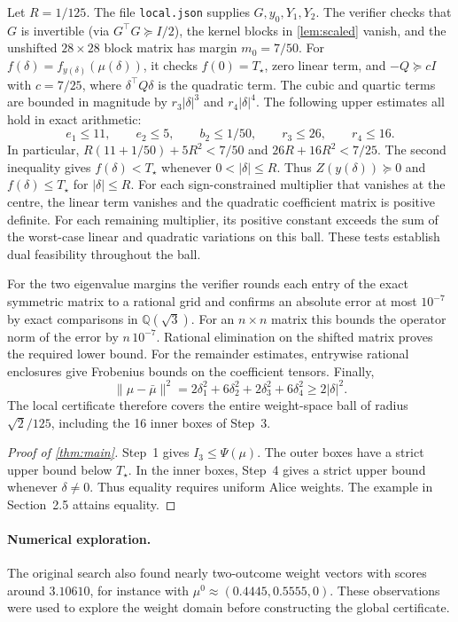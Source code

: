 \documentclass[11pt]{article}
\theoremstyle{definition}
\newcommand{\Tq}{T_{\star}}
\begin{document}
Let $R=1/125$. The file \texttt{local.json} supplies $G,y_0,Y_1,Y_2$.
The verifier checks that $G$ is invertible (via $G^\top G\succeq I/2$), the kernel blocks in
\cref{lem:scaled} vanish, and the unshifted $28\times28$ block matrix has margin $m_0=7/50$.
For $f(\delta)=f_{y(\delta)}(\mu(\delta))$, it checks $f(0)=\Tq$, zero linear term,
and $-Q\succeq cI$ with $c=7/25$, where $\delta^\top Q\delta$ is the quadratic term.
The cubic and quartic terms are bounded in magnitude by $r_3|\delta|^3$ and $r_4|\delta|^4$.
The following upper estimates all hold in exact arithmetic:
\[
 e_1\le11,\qquad e_2\le5,\qquad b_2\le1/50,\qquad r_3\le26,\qquad r_4\le16.
\]
In particular, $R(11+1/50)+5R^2<7/50$ and $26R+16R^2<7/25$. The second inequality gives $f(\delta)<\Tq$ whenever $0<|\delta|\le R$.
Thus $Z(y(\delta))\succeq0$ and $f(\delta)\le\Tq$ for $|\delta|\le R$.
For each sign-constrained multiplier that vanishes at the centre, the linear term vanishes and
the quadratic coefficient matrix is positive definite. For each remaining multiplier, its
positive constant exceeds the sum of the worst-case linear and quadratic variations on this ball.
These tests establish dual feasibility throughout the ball.

For the two eigenvalue margins the verifier rounds each entry of the exact symmetric matrix
to a rational grid and confirms an absolute error at most $10^{-7}$ by exact comparisons in
$\mathbb Q(\sqrt3)$. For an $n\times n$ matrix this bounds the operator norm of the error by
$n\,10^{-7}$. Rational elimination on the shifted matrix proves the required lower bound.
For the remainder estimates, entrywise rational enclosures give Frobenius bounds on the
coefficient tensors. Finally,
\[
 \|\mu-\bar\mu\|^2=2\delta_1^2+6\delta_2^2+2\delta_3^2+6\delta_4^2\ge 2|\delta|^2 .
\]
The local certificate therefore covers the entire weight-space ball of radius $\sqrt2/125$,
including the 16 inner boxes of Step~3.

\begin{proof}[Proof of \cref{thm:main}]
Step~1 gives $I_3\le\Psi(\mu)$. The outer boxes have a strict upper bound below $\Tq$.
In the inner boxes, Step~4 gives a strict upper bound whenever $\delta\ne0$.
Thus equality requires uniform Alice weights. The example in Section~2.5 attains equality.
\end{proof}

\paragraph{Numerical exploration.}
The original search also found nearly two-outcome weight vectors with scores around $3.10610$,
for instance with $\mu^0\approx(0.4445,0.5555,0)$. These observations were used to explore
the weight domain before constructing the global certificate.
\end{document}
